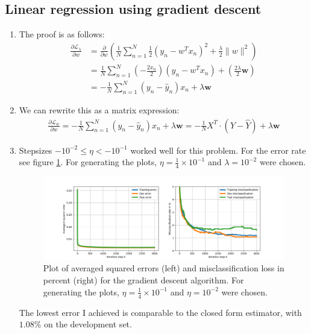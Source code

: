 \documentclass[12pt]{article}
\begin{document}
\subsection{Linear regression using gradient descent}

\begin{enumerate}
	\item The proof is as follows:
		\begin{align*}
			\frac{\partial \mathcal{L}_\lambda}{\partial w} &= \frac{\partial}{\partial w} \left( \frac{1}{N} \sum_{n=1}^{N} \frac{1}{2} \left( y_n - w^Tx_n \right)^2 + \frac{\lambda}{2} \lVert w \rVert^2 \right) \\
			&= \frac{1}{N} \sum_{n=1}^{N} \left( -\frac{2x_n}{2} \right) \left( y_n - w^Tx_n \right) + \left( \frac{2\lambda}{2} \textbf{w}  \right) \\
			&= -\frac{1}{N} \sum_{n=1}^{N} \left( y_n - \hat{y}_n \right) x_n + \lambda \textbf{w}
		\end{align*}
	\item We can rewrite this as a matrix expression:
		\begin{align*}
			\frac{\partial \mathcal{L}_w}{\partial w} = -\frac{1}{N} \sum_{n=1}^{N} \left( y_n - \hat{y}_n \right) x_n + \lambda \textbf{w} = - \frac{1}{N} X^T \cdot \left( Y - \hat{Y} \right) + \lambda \textbf{w}
		\end{align*}
	\item Stepsizes $ -10^{-2} \leq \eta < -10^{-1} $ worked well for this problem. For the error rate see figure \ref{fig:1.2}. For generating the plots, $\eta = \frac{1}{4}\times 10^{-1}$ and $\lambda=10^{-2}$ were chosen.
		\begin{figure}[h!]
			\centering
			\includegraphics[width=\linewidth]{./Problem_1/Problem_1.2.png}
			\caption{Plot of averaged squared errors (left) and misclassification loss in percent (right) for the gradient descent algorithm. For generating the plots, $\eta = \frac{1}{4}\times 10^{-1}$ and $\eta=10^{-2}$ were chosen.}
			\label{fig:1.2}
		\end{figure}
	The lowest error I achieved is comparable to the closed form estimator, with $1.08\%$ on the development set. 
\end{enumerate}
\end{document}

